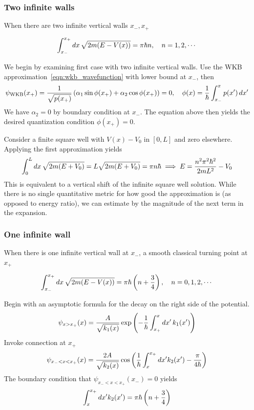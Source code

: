 \subsubsection{Two infinite walls}
When there are two infinite vertical walls $x_-, x_+$ 
\begin{mdframed}
\[ 
    \int_{x_-}^{x_+}dx \, \sqrt{2m(E - V(x))} = \pi \hbar n, \quad n=1, 2, \cdots 
\] 
\end{mdframed}
We begin by examining first case with two infinite vertical walls. 
Use the WKB approximation~\ref{eqn:wkb_wavefunction} with lower bound at $x_-$, then 
\[ 
    \psi_{\mathrm{WKB}}(x_+) = \dfrac 1 {\sqrt{p(x_+)}}
    \left(\alpha_1 \sin \phi(x_+) + \alpha_2\cos\phi(x_+)\right)=0, \quad 
    \phi(x) = \dfrac 1 {\hbar} \int_{x_-}^x p(x')\, dx' 
\] 
We have $\alpha_2=0$ by boundary condition at $x_-$. 
The equation above then yields the desired quantization condition $\phi(x_+) = 0$. 
\begin{example}
    Consider a finite square well with $V(x) -V_0$ in $[0, L]$ and zero elsewhere. 
    Applying the first approximation yields 
    \[ 
        \int_0^L dx\, \sqrt{2m(E + V_0)} = L\sqrt{2m(E + V_0)} = \pi n \hbar 
        \implies E = \dfrac{n^2\pi^2\hbar^2}{2mL^2} - V_0
    \] 
    This is equivalent to a vertical shift of the infinite square well solution. 
    While there is no single quantitative metric for how good the approximation is 
    (as opposed to energy ratio), we can estimate by the magnitude of the next term in 
    the expansion. 
\end{example}

\subsubsection{One infinite wall}
When there is one infinite vertical wall at $x_-$, a smooth classical turning point at $x_+$
\begin{mdframed}
    \[ 
        \int_{x_-}^{x_+}dx\, \sqrt{2m(E - V(x))} = \pi \hbar \left(n + \dfrac 3 4\right), 
        \quad n = 0, 1, 2, \cdots 
    \] 
\end{mdframed}
Begin with an asymptotic formula for the decay on the right side of the potential. 
\[ 
    \psi_{x>x_+}(x) = \dfrac{A}{\sqrt{k_1(x)}}\exp \left(-\dfrac 1 {\hbar} \int_{x_+}^x dx'\, k_1(x')\right)
\] 
Invoke connection at $x_+$ 
\[ 
    \psi_{x_-<x<x_+}(x) 
    = \frac{2A}{\sqrt{k_2(x)}} \cos \left(\dfrac 1 {\hbar} \int_{x}^{x_+} dx' k_2(x') - \frac{\pi}{4\hbar } \right)
\] 
The boundary condition that $\psi_{x_-<x<x_+}(x_-)=0$ yields 
\[ 
    \int_{x}^{x_+} dx' k_2(x') = \pi \hbar \left(n + \dfrac 3 4\right)
\] 
